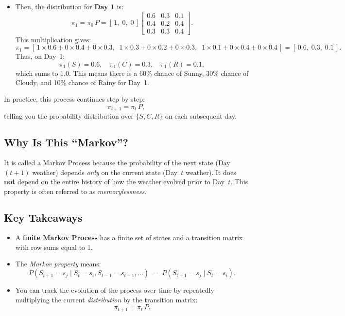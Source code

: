 \begin{appendices}
\begin{itemize}
  \item Then, the distribution for \textbf{Day 1} is:
  \[
    \pi_1 
    = \pi_0 \, P
    = [\, 1,\; 0,\; 0 \,]
      \begin{bmatrix}
      0.6 & 0.3 & 0.1 \\
      0.4 & 0.2 & 0.4 \\
      0.3 & 0.3 & 0.4
      \end{bmatrix}.
  \]
  This multiplication gives:
  \[
    \pi_1 
    = [\, 1 \times 0.6 + 0 \times 0.4 + 0 \times 0.3,\;\;
         1 \times 0.3 + 0 \times 0.2 + 0 \times 0.3,\;\;
         1 \times 0.1 + 0 \times 0.4 + 0 \times 0.4 \,]
    = [\, 0.6,\; 0.3,\; 0.1 \,].
  \]
  Thus, on Day~1:
  \[
    \pi_1(S) = 0.6, \quad \pi_1(C) = 0.3, \quad \pi_1(R) = 0.1,
  \]
  which sums to \(1.0\). This means there is a 60\% chance of Sunny, 30\% chance of Cloudy, and 10\% chance of Rainy for Day~1.
\end{itemize}

In practice, this process continues step by step:
\[
\pi_{t+1} = \pi_t \, P, 
\]
telling you the probability distribution over \(\{S, C, R\}\) on each subsequent day.

\subsection{Why Is This ``Markov''?}
It is called a Markov Process because the probability of the next state (Day~\((t+1)\) weather) depends \textit{only} on the current state (Day~\(t\) weather). It does \textbf{not} depend on the entire history of how the weather evolved prior to Day~\(t\). This property is often referred to as \textit{memorylessness}.

\subsection{Key Takeaways}
\begin{itemize}
  \item A \textbf{finite Markov Process} has a finite set of states and a transition matrix with row sums equal to 1.
  \item The \textit{Markov property} means: 
  \[
   P(S_{t+1} = s_j \;\vert\; S_t = s_i, S_{t-1} = s_{t-1}, \dots) 
   \;=\;
   P(S_{t+1} = s_j \;\vert\; S_t = s_i).
  \]
  \item You can track the evolution of the process over time by repeatedly multiplying the current \textit{distribution} by the transition matrix:
  \[
   \pi_{t+1} = \pi_t \, P.
  \]
\end{itemize}



\end{appendices}
